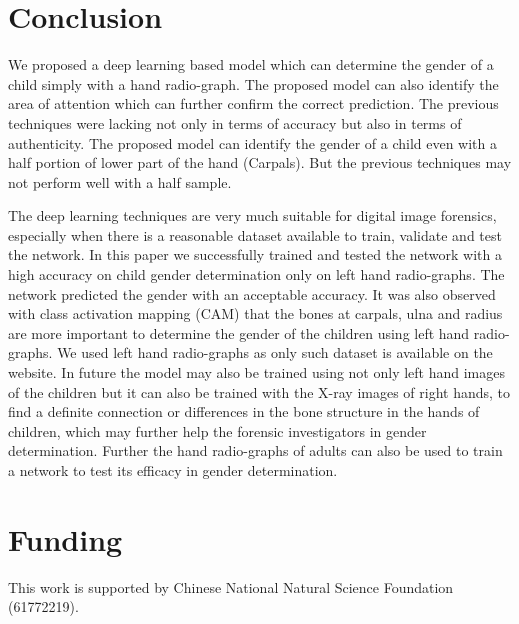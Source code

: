 \documentclass{bioinfo}
\begin{document}
\section{Conclusion}
We proposed a deep learning based model which can determine the gender of a child simply with a hand radio-graph. The proposed model can also identify the area of attention which can further confirm the correct prediction. The previous techniques were lacking not only in terms of accuracy but also in terms of authenticity. The proposed model can identify the gender of a child even with a half portion of lower part of the hand (Carpals). But the previous techniques may not perform well with a half sample. 
%
%


The deep learning techniques are very much suitable for digital image forensics, especially when there is a reasonable dataset available to train, validate and test the network. In this paper we successfully trained and tested the network with a high accuracy on child gender determination only on left hand radio-graphs.
The network predicted the gender with an acceptable accuracy. It was also observed with class activation mapping (CAM) that the bones at carpals, ulna and radius are more important to determine the gender of the children using left hand radio-graphs. We used left hand radio-graphs as only such dataset is available on the website. In future the model may also be trained using not only left hand images of the children but it can also be trained with the X-ray images of right hands, to find a definite connection or differences in the bone structure in the hands of children, which may further help the forensic investigators in gender determination. Further the hand radio-graphs of adults can also be used to train a network to test its efficacy in gender determination.\vspace*{-10pt}


\section{Funding}

This work is supported by Chinese National Natural Science Foundation (61772219).\vspace*{-12pt}
\end{document}
